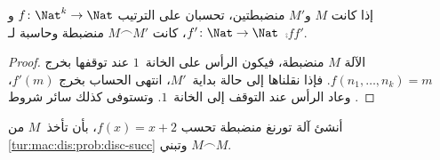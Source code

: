 \documentclass[../../../include/open-logic-section]{subfiles}
\begin{document}
\begin{prop}
إذا كانت $M$ و$M'$ منضبطتين، تحسبان على الترتيب $f\colon
    \Nat^k\to\Nat$ و$f'\colon\Nat\to\Nat$، كانت $M\frown M'$ منضبطة وحاسبة لـ~$\comp{f}{f'}$.
\end{prop}

\begin{proof}
الآلة $M$ منضبطة، فيكون الرأس على الخانة~$1$ عند توقفها بخرج $f(n_1,\dots,n_k)=m$. فإذا نقلناها إلى حالة بداية~$M'$، انتهى الحساب بخرج $f'(m)$، وعاد الرأس عند التوقف إلى الخانة~$1$. وتستوفى كذلك سائر شروط .
\end{proof}

\begin{prob}
أنشئ آلة تورنغ منضبطة تحسب $f(x)=x+2$، بأن تأخذ~$M$ من \cref{tur:mac:dis:prob:disc-succ} وتبني $M\frown M$.
\end{prob}
\end{document}
